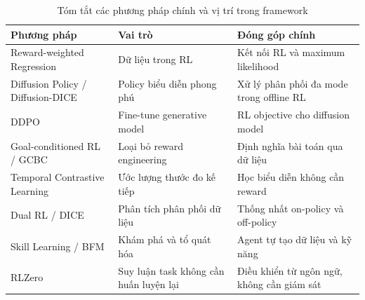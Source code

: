 \begin{table}[H]
    \centering
    \caption{Tóm tắt các phương pháp chính và vị trí trong framework}
    \label{tab:summary}
    \begin{tabular}{p{3.5cm} p{4cm} p{4.5cm}}
        \toprule
        \textbf{Phương pháp} & \textbf{Vai trò} & \textbf{Đóng góp chính} \\
        \midrule
        Reward-weighted Regression & Dữ liệu trong RL & Kết nối RL và maximum likelihood \\
        \midrule
        Diffusion Policy / Diffusion-DICE & Policy biểu diễn phong phú & Xử lý phân phối đa mode trong offline RL \\
        \midrule
        DDPO & Fine-tune generative model & RL objective cho diffusion model \\
        \midrule
        Goal-conditioned RL / GCBC & Loại bỏ reward engineering & Định nghĩa bài toán qua dữ liệu \\
        \midrule
        Temporal Contrastive Learning & Ước lượng thước đo kế tiếp & Học biểu diễn không cần reward \\
        \midrule
        Dual RL / DICE & Phân tích phân phối dữ liệu & Thống nhất on-policy và off-policy \\
        \midrule
        Skill Learning / BFM & Khám phá và tổ quát hóa & Agent tự tạo dữ liệu và kỹ năng \\
        \midrule
        RLZero & Suy luận task không cần huấn luyện lại & Điều khiển từ ngôn ngữ, không cần giám sát \\
        \bottomrule
    \end{tabular}
\end{table}